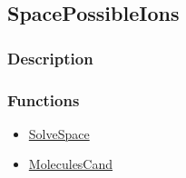 \subsection{SpacePossibleIons}\label{SpacePossibleIons}
\subsubsection{Description}


\subsubsection{Functions}
\begin{itemize}
\item \hyperref[SolveSpace]{SolveSpace}
\item \hyperref[MoleculesCand]{MoleculesCand}
\end{itemize}

